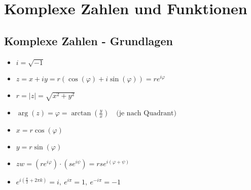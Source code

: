 \section{Komplexe Zahlen und Funktionen}
\subsection{Komplexe Zahlen - Grundlagen}

\begin{itemize}[noitemsep,topsep=0pt]
	
\item	\(i  = \sqrt{-1}\)
\item	\(z  = x + iy = r(\cos(\varphi) + i\sin(\varphi)) = re^{i\varphi} \)
\item	\(r  = |z| = \sqrt{x^2 + y^2} \)
\item	\(\arg(z)  = \varphi  = \arctan(\frac{y}{x}) \quad \text{(je nach Quadrant)}  \)
\item	\(x  = r\cos(\varphi) \)
\item	\(y  = r\sin(\varphi) \)
\item	\(zw  = (re^{i\varphi})\cdot(se^{i\psi}) = rse^{i(\varphi + \psi)} \)
\item	\(e^{i(\frac{\pi}{2} + 2\pi k)}  = i,\ e^{i\pi} = 1, \ e^{-i\pi} = -1\)

\end{itemize}

